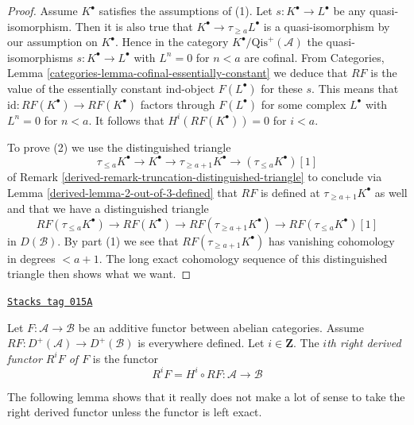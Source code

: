 \begin{proof}

Assume $K^\bullet$ satisfies the assumptions of (1).
Let $s : K^\bullet \to L^\bullet$ be any quasi-isomorphism.
Then it is also true that $K^\bullet \to \tau_{\geq a}L^\bullet$
is a quasi-isomorphism by our assumption on $K^\bullet$.
Hence in the category $K^\bullet/\text{Qis}^{+}(\mathcal{A})$ the
quasi-isomorphisms $s : K^\bullet \to L^\bullet$ with $L^n = 0$
for $n < a$ are cofinal. From Categories, Lemma
\ref{categories-lemma-cofinal-essentially-constant}
we deduce that $RF$ is the value of the essentially constant
ind-object $F(L^\bullet)$ for these $s$. This means that
$\text{id} : RF(K^\bullet) \to RF(K^\bullet)$ factors through
$F(L^\bullet)$ for some complex $L^\bullet$ with $L^n = 0$
for $n < a$. It follows that $H^i(RF(K^\bullet)) = 0$ for $i < a$.

\medskip\noindent
To prove (2) we use the distinguished triangle
$$
\tau_{\leq a}K^\bullet \to K^\bullet \to \tau_{\geq a + 1}K^\bullet
\to (\tau_{\leq a}K^\bullet)[1]
$$
of Remark \ref{derived-remark-truncation-distinguished-triangle} to conclude
via Lemma \ref{derived-lemma-2-out-of-3-defined} that
$RF$ is defined at $\tau_{\geq a + 1}K^\bullet$ as well and that we have
a distinguished triangle
$$
RF(\tau_{\leq a}K^\bullet) \to RF(K^\bullet) \to RF(\tau_{\geq a + 1}K^\bullet)
\to RF(\tau_{\leq a}K^\bullet)[1]
$$
in $D(\mathcal{B})$. By part (1) we see that $RF(\tau_{\geq a + 1}K^\bullet)$
has vanishing cohomology in degrees $< a + 1$. The long exact cohomology
sequence of this distinguished triangle then shows what we want.
\end{proof}

\begin{definition}
\label{derived-definition-higher-derived-functors}
\href{https://stacks.math.columbia.edu/tag/015A}{\texttt{Stacks tag 015A}}

Let $F : \mathcal{A} \to \mathcal{B}$ be an additive functor
between abelian categories. Assume
$RF : D^{+}(\mathcal{A}) \to D^{+}(\mathcal{B})$ is everywhere
defined. Let $i \in \mathbf{Z}$.
The {\it $i$th right derived functor $R^iF$ of $F$} is the functor
$$
R^iF = H^i \circ RF :
\mathcal{A}
\longrightarrow
\mathcal{B}
$$
\end{definition}

The following lemma shows that it really does not make a lot
of sense to take the right derived functor unless the functor
is left exact.


